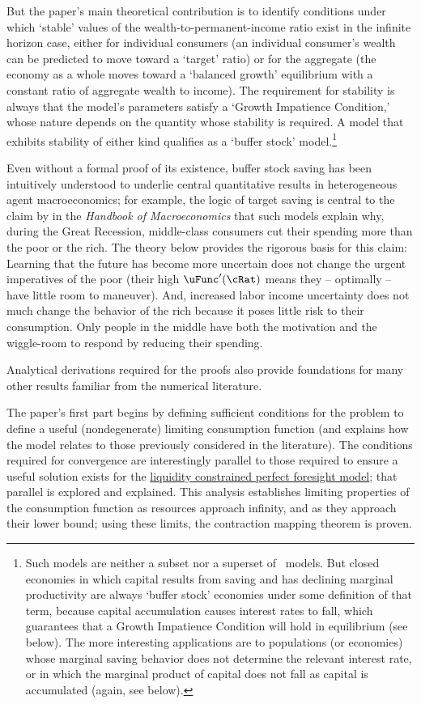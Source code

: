 \documentclass[BufferStockTheory]{subfiles}
\begin{document}
But the paper's main theoretical contribution is to identify conditions under which `stable' values of the wealth-to-permanent-income ratio exist in the infinite horizon case, either for individual consumers (an individual consumer's wealth can be predicted to move toward a `target' ratio) or for the aggregate (the economy as a whole moves toward a `balanced growth' equilibrium with a constant ratio of aggregate wealth to income).  The requirement for stability is always that the model's parameters satisfy a `Growth Impatience Condition,' whose nature depends on the quantity whose stability is required.  A model that exhibits stability of either kind qualifies as a `buffer stock' model.\footnote{Such models are neither a subset nor a superset of~\cite{bewleyPIH} models.  But closed economies in which capital results from saving and has declining marginal productivity are always `buffer stock' economies under some definition of that term, because capital accumulation causes interest rates to fall, which guarantees that a Growth Impatience Condition will hold in equilibrium (see below).  The more interesting applications are to populations (or economies) whose marginal saving behavior does not determine the relevant interest rate, or in which the marginal product of capital does not fall as capital is accumulated (again, see below).}

\hypertarget{KMP}{} Even without a formal proof of its existence, buffer stock saving has been intuitively understood to underlie central quantitative results in heterogeneous agent macroeconomics; for example, the logic of target saving is central to the claim by \cite{kmpHandbook} in the \textit{Handbook of Macroeconomics} that such models explain why, during the Great Recession, middle-class consumers cut their spending more than the poor or the rich.  The theory below provides the rigorous basis for this claim:  Learning that the future has become more uncertain does not change the urgent imperatives of the poor (their high $\uFunc^{\prime}(\cRat)$ means they -- optimally -- have little room to maneuver).  And, increased labor income uncertainty does not much change the behavior of the rich because it poses little risk to their consumption.  Only people in the middle have both the motivation and the wiggle-room to respond by reducing their spending.

Analytical derivations required for the proofs also provide foundations for many other results familiar from the numerical literature.

The paper's first part begins by defining sufficient conditions for the problem to define a useful (nondegenerate) limiting consumption function (and explains how the model relates to those previously considered in the literature).  The conditions required for convergence are interestingly parallel to those required to ensure a useful solution exists for the \hyperlink{Factors-Defined-And-Compared}{liquidity constrained perfect foresight model}; that parallel is explored and explained.  This analysis establishes limiting properties of the consumption function as resources approach infinity, and as they approach their lower bound; using these limits, the contraction mapping theorem is proven.
\end{document}
